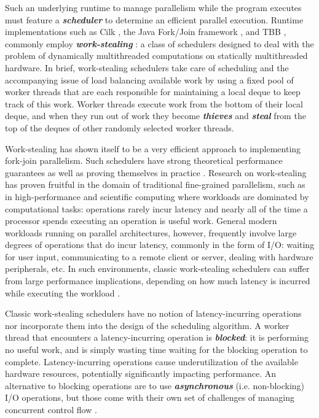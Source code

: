 \documentclass[bsc,frontabs,singlespacing,parskip,deptreport,normalheadings]{infthesis}
\begin{document}
Such an underlying runtime to manage parallelism while the program executes must
feature a \textit{\textbf{scheduler}} to determine an efficient parallel
execution. Runtime implementations such as Cilk
\cite{frigo_implementation_1998}, the Java Fork/Join framework
\cite{lea_java_2000}, and TBB \cite{noauthor_advanced_nodate}, commonly employ
\textbf{\textit{work-stealing}} \cite{blumofe_cilk_1995}: a class of schedulers designed to deal with the
problem of dynamically multithreaded computations on statically multithreaded
hardware. In brief, work-stealing schedulers take care
of scheduling and the accompanying issue of load balancing available work by
using a fixed pool of worker threads that are each responsible for maintaining a
local deque to keep track of this work. Worker threads execute work from the
bottom of their local deque, and when they run out of work they become
\textit{\textbf{thieves}} and \textit{\textbf{steal}} from the top of the deques
of other randomly selected worker threads.

Work-stealing has shown itself to be a very efficient approach to implementing
fork-join parallelism. Such schedulers have strong theoretical performance
guarantees \cite{blumofe_scheduling_1999} as well as proving themselves in
practice \cite{arora_thread_1998}. Research on work-stealing has proven fruitful
in the domain of traditional fine-grained parallelism, such as in
high-performance and scientific computing where workloads are dominated by
computational tasks: operations rarely incur latency and nearly all of the time
a processor spends executing an operation is useful work. General modern
workloads running on parallel architectures, however, frequently involve large
degrees of operations that do incur latency, commonly in the form of I/O:
waiting for user input, communicating to a remote client or server, dealing with
hardware peripherals, etc. In such environments, classic work-stealing
schedulers can suffer from large performance implications, depending on how much
latency is incurred while executing the workload
\cite{muller_latency-hiding_2016, singer_scheduling_2019, zakian_concurrent_2016}.

Classic work-stealing schedulers have no notion of latency-incurring operations
nor incorporate them into the design of the scheduling algorithm. A worker
thread that encounters a latency-incurring operation is
\textbf{\textit{blocked}}: it is performing no useful work, and is simply
wasting time waiting for the blocking operation to complete. Latency-incurring
operations cause underutilization of the available hardware resources,
potentially significantly impacting performance. An alternative to blocking
operations are to use \textbf{\textit{asynchronous}} (i.e. non-blocking) I/O
operations, but those come with their own set of challenges of managing
concurrent control flow \cite{niebler_structured_2020, smith_notes_nodate}.
\end{document}
